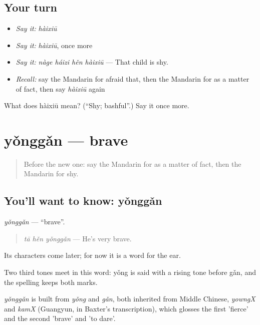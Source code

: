 \subsection*{Your turn}
\begin{itemize}
\raggedright
  \item \emph{Say it:} \emph{hàixiū}
  \item \emph{Say it:} \emph{hàixiū}, once more
  \item \emph{Say it:} \emph{nàge háizi hěn hàixiū} — That child is shy.
  \item \emph{Recall:} say the Mandarin for afraid that, then the Mandarin for as a matter of fact, then say \emph{hàixiū} again
\end{itemize}

\begin{tcolorbox}[breakable,colback=teal!4,colframe=teal!35!black,title={Before you move on}]
What does hàixiū mean? (\textquotedblleft{}Shy; bashful\textquotedblright{}.) Say it once more.
\end{tcolorbox}
\section[yǒnggǎn]{yǒnggǎn — brave}

\label{lesson:ZH-C265-yonggan}



\begin{quote}
Before the new one: say the Mandarin for as a matter of fact, then the Mandarin for shy.
\end{quote}

\subsection*{You'll want to know: yǒnggǎn}
\emph{yǒnggǎn} — \textquotedblleft{}brave\textquotedblright{}.

\begin{quote}
\emph{tā hěn yǒnggǎn} — He's very brave.
\end{quote}

Its characters come later; for now it is a word for the ear.

Two third tones meet in this word: yǒng is said with a rising tone before gǎn, and the spelling keeps both marks.

\begin{cousinweb}
\emph{yǒnggǎn} is built from \emph{yǒng} and \emph{gǎn}, both inherited from Middle Chinese, \emph{yowngX} and \emph{kamX} (Guangyun, in Baxter's transcription), which glosses the first 'fierce' and the second 'brave' and 'to dare'.
\end{cousinweb}

